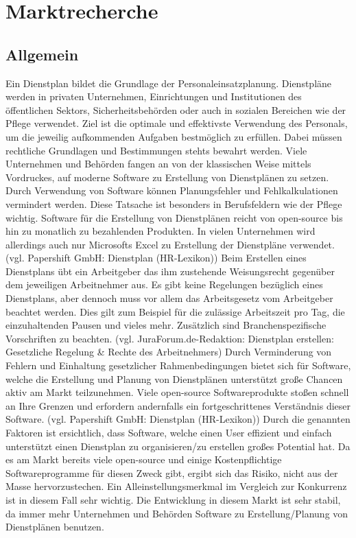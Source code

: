\documentclass[10pt,a4paper]{article}
\begin{document}
\section{Marktrecherche}
\subsection{Allgemein}
Ein Dienstplan bildet die Grundlage der Personaleinsatzplanung. Dienstpläne werden in privaten Unternehmen, Einrichtungen und Institutionen des öffentlichen Sektors, Sicherheitsbehörden oder auch in sozialen Bereichen wie der Pflege verwendet. Ziel ist die optimale und effektivste Verwendung des Personals, um die jeweilig aufkommenden Aufgaben bestmöglich zu erfüllen. Dabei müssen rechtliche Grundlagen und Bestimmungen stehts bewahrt werden. 
Viele Unternehmen und Behörden fangen an von der klassischen Weise mittels Vordruckes, auf moderne Software zu Erstellung von Dienstplänen zu setzen. Durch Verwendung von Software können Planungsfehler und Fehlkalkulationen vermindert werden. Diese Tatsache ist besonders in Berufsfeldern wie der Pflege wichtig. Software für die Erstellung von Dienstplänen reicht von open-source bis hin zu monatlich zu bezahlenden Produkten. In vielen Unternehmen wird allerdings auch nur Microsofts Excel zu Erstellung der Dienstpläne verwendet. (vgl. Papershift GmbH: Dienstplan (HR-Lexikon))
Beim Erstellen eines Dienstplans übt ein Arbeitgeber das ihm zustehende Weisungsrecht gegenüber dem jeweiligen Arbeitnehmer aus. Es gibt keine Regelungen bezüglich eines Dienstplans, aber dennoch muss vor allem das Arbeitsgesetz vom Arbeitgeber beachtet werden. Dies gilt zum Beispiel für die zulässige Arbeitszeit pro Tag, die einzuhaltenden Pausen und vieles mehr. Zusätzlich sind Branchenspezifische Vorschriften zu beachten. (vgl. JuraForum.de-Redaktion: Dienstplan erstellen: Gesetzliche Regelung & Rechte des Arbeitnehmers)
Durch Verminderung von Fehlern und Einhaltung gesetzlicher Rahmenbedingungen bietet sich für Software, welche die Erstellung und Planung von Dienstplänen unterstützt große Chancen aktiv am Markt teilzunehmen. Viele open-source Softwareprodukte stoßen schnell an Ihre Grenzen und erfordern andernfalls ein fortgeschrittenes Verständnis dieser Software. (vgl. Papershift GmbH: Dienstplan (HR-Lexikon))
Durch die genannten Faktoren ist ersichtlich, dass Software, welche einen User effizient und einfach unterstützt einen Dienstplan zu organisieren/zu erstellen großes Potential hat. 
Da es am Markt bereits viele open-source und einige Kostenpflichtige Softwareprogramme für diesen Zweck gibt, ergibt sich das Risiko, nicht aus der Masse hervorzustechen. Ein Alleinstellungsmerkmal im Vergleich zur Konkurrenz ist in diesem Fall sehr wichtig. Die Entwicklung in diesem Markt ist sehr stabil, da immer mehr Unternehmen und Behörden Software zu Erstellung/Planung von Dienstplänen benutzen.
\end{document}
